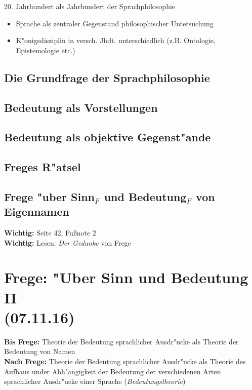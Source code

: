 \documentclass[]{scrartcl}
\begin{document}
20. Jahrhundert als Jahrhundert der Sprachphilosophie
\begin{itemize}
  \item Sprache als zentraler Gegenstand philosophischer Untersuchung
  \item K"onigsdisziplin in versch. Jhdt. unterschiedlich (z.B. Ontologie, Epistemologie etc.)
\end{itemize}

\subsection{Die Grundfrage der Sprachphilosophie}

\subsection{Bedeutung als Vorstellungen}

\subsection{Bedeutung als objektive Gegenst"ande}

\subsection{Freges R"atsel}

\subsection{Frege "uber Sinn$_{F}$ und Bedeutung$_{F}$ von Eigennamen}

\textbf{Wichtig:} Seite 42, Fu\ss note 2\\
\textbf{Wichtig:} Lesen: \emph{Der Gedanke }von Frege


\section{Frege: "Uber Sinn und Bedeutung II\\(07.11.16)}


\textbf{Bis Frege:} Theorie der Bedeutung sprachlicher Ausdr"ucke als Theorie der Bedeutung von Namen\\
\textbf{Nach Frege:} Theorie der Bedeutung sprachlicher Ausdr"ucke als Theorie des Aufbaus under Abh"angigkeit der Bedeutung der verschiedenen Arten sprachlicher Ausdr"ucke einer Sprache (\emph{Bedeutungstheorie})
\end{document}
